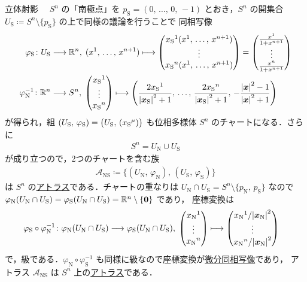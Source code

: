 \documentclass[geometry_main]{subfiles}
\begin{document}
\begin{myexample}[label=ex:stereographic-projection]{立体射影}
	　$S^n$ の「南極点」を $p_{\mathrm{S}} = (0,\, \dots ,\, 0,\,  -1)$ とおき，$S^n$ の開集合 $U_{\mathrm{S}} \coloneqq S^n \setminus \{ p_{\mathrm{S}} \}$ の上で同様の議論を行うことで
	同相写像
	\begin{align}
		\varphi_{\mathrm{S}} \colon U_{\mathrm{S}} &\lto \mathbb{R}^n,\;
		(x^1,\, \dots,\, x^{n+1}) \lmto \mqty(x_{\mathrm{S}}{}^1(x^1,\, \dots,\, x^{n+1}) \\ \vdots \\ x_{\mathrm{S}}{}^n(x^1,\, \dots,\, x^{n+1})) = \mqty(\frac{x^1}{1+x^{n+1}} \\ \vdots \\ \frac{x^n}{1+x^{n+1}}) \\
		\varphi_{\mathrm{N}}^{-1} \colon \mathbb{R}^n &\lto S^n,\;
		\mqty(x_{\mathrm{S}}{}^1 \\ \vdots \\ x_{\mathrm{S}}{}^n) \lmto \left(\frac{2 x_{\mathrm{S}}{}^1}{\abs{\vb*{x}_{\mathrm{S}}}^2 +1}, \, \dots,\, \frac{2 x_{\mathrm{S}}{}^n}{\abs{\vb*{x}_{\mathrm{S}}}^2 +1},\, -\frac{\abs{\vb*{x}}^2 -1}{\abs{\vb*{x}}^2 +1}\right)
	\end{align}
	が得られ，組 $(U_{\mathrm{S}},\, \varphi_{\mathrm{S}}) = \bigl(U_{\mathrm{S}},\, (x_{\mathrm{S}}{}^\mu)\bigr)$ も位相多様体 $S^n$ のチャートになる．さらに
	\begin{align}
		S^n = U_{\mathrm{N}} \cup U_{\mathrm{S}}
	\end{align}
	が成り立つので，2つのチャートを含む族
	\begin{align}
		\mathcal{A}_{\mathrm{NS}} \coloneqq \bigl\{ (U_{\mathrm{N}},\, \varphi_{\mathrm{N}}),\, (U_{\mathrm{S}},\, \varphi_{\mathrm{S}})\bigr\}
	\end{align}
	は $S^n$ の\hyperref[def.atlas]{アトラス}である．チャートの重なりは
	$U_{\mathrm{N}} \cap U_{\mathrm{S}} = S^n \setminus \{p_{\mathrm{N}},\, p_{\mathrm{S}}\}$
	なので $\varphi_{\mathrm{N}}(U_{\mathrm{N}} \cap U_{\mathrm{S}}) = \varphi_{\mathrm{S}}(U_{\mathrm{N}}\cap U_{\mathrm{S}}) = \mathbb{R}^n\setminus \{\vb*{0}\}$ であり，
	座標変換は
	\begin{align}
		\label{ex.stereo}
		\varphi_{\mathrm{S}} \circ \varphi_{\mathrm{N}}^{-1} \colon \varphi_{\mathrm{N}}(U_{\mathrm{N}} \cap U_{\mathrm{S}}) &\lto \varphi_{\mathrm{S}}(U_{\mathrm{N}}\cap U_{\mathrm{S}}),\;
		\mqty(x_{\mathrm{N}}{}^1 \\ \vdots \\ x_{\mathrm{N}}{}^n) \lmto \mqty(x_{\mathrm{N}}{}^1/\abs{\vb*{x}_{\mathrm{N}}}^2 \\ \vdots \\ x_{\mathrm{N}}{}^n/\abs{\vb*{x}_{\mathrm{N}}}^2)
	\end{align}
	で，\cinfty 級である．$\varphi_{\mathrm{N}} \circ \varphi_{\mathrm{S}}^{-1}$ も同様に\cinfty 級なので座標変換が\hyperref[def.diffeomo]{微分同相写像}であり，
	アトラス $\mathcal{A}_{\mathrm{NS}}$ は $S^n$ 上の\hyperref[diffmani]{\cinfty アトラス}である．


\end{myexample}
\end{document}
